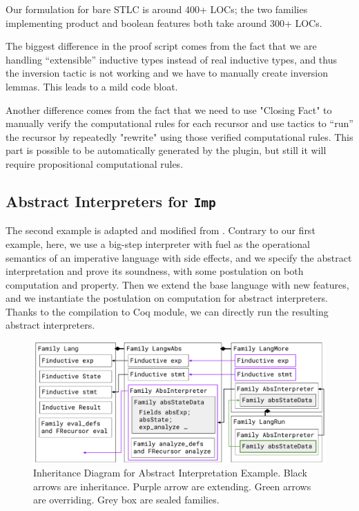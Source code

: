 Our formulation for bare STLC is around 400+ LOCs; the two families implementing product and boolean features both take around 300+ LOCs. 

The biggest difference in the proof script comes from the fact that we
are handling ``extensible'' inductive types instead of real inductive
types, and thus the inversion tactic is not working and we have to manually
create inversion lemmas. This leads to a mild code bloat. 

Another difference comes from the fact that we need to use "Closing
Fact" to manually verify the computational rules for each recursor and
use tactics to ``run'' the recursor by repeatedly "rewrite" using those
verified computational rules. This part is possible to be automatically
generated by the plugin, but still it will require propositional
computational rules.

\subsection{Abstract Interpreters for \texttt{Imp}}
The second example is adapted and modified from \citet{zm2017}.
Contrary to our first example, here, we use a big-step interpreter with fuel
as the operational semantics of an imperative language with
side effects, and we specify the abstract interpretation and prove its
soundness, with some postulation on both computation and property.
Then we extend the base language with new features, and we instantiate
the postulation on computation for
abstract interpreters.
Thanks to the compilation to Coq module, we can directly run the resulting
abstract interpreters.

\begin{figure}[!htb]
  \includegraphics[width=\columnwidth]{coqexmaple/Family-Lang-Imp2.pdf}
  \caption{Inheritance Diagram for Abstract Interpretation Example. Black arrows are inheritance. Purple arrow are extending. Green arrows are overriding. Grey box are sealed families.}\label{fig:abstract-interpretation-example}
\end{figure}

